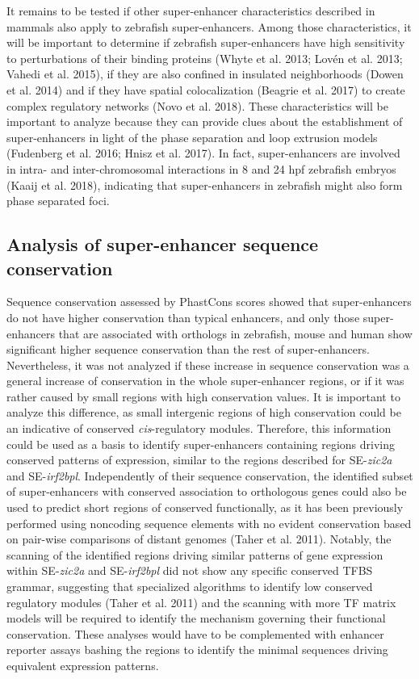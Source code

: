It remains to be tested if other super-enhancer characteristics described in mammals also apply to zebrafish super-enhancers. Among those characteristics, it will be important to determine if zebrafish super-enhancers have high sensitivity to perturbations of their binding proteins (Whyte et al. 2013; Lovén et al. 2013; Vahedi et al. 2015), if they are also confined in insulated neighborhoods (Dowen et al. 2014) and if they have spatial colocalization (Beagrie et al. 2017) to create complex regulatory networks (Novo et al. 2018). These characteristics will be important to analyze because they can provide clues about the establishment of super-enhancers in light of the phase separation and loop extrusion models (Fudenberg et al. 2016; Hnisz et al. 2017). In fact, super-enhancers are involved in intra- and inter-chromosomal interactions in 8 and 24 hpf zebrafish embryos (Kaaij et al. 2018), indicating that super-enhancers in zebrafish might also form phase separated foci.\\

		\subsection{Analysis of super-enhancer sequence conservation}

Sequence conservation assessed by PhastCons scores showed that super-enhancers do not have higher conservation than typical enhancers, and only those super-enhancers that are associated with orthologs in zebrafish, mouse and human show significant higher sequence conservation than the rest of super-enhancers. Nevertheless, it was not analyzed if these increase in sequence conservation was a general increase of conservation in the whole super-enhancer regions, or if it was rather caused by small regions with high conservation values. It is important to analyze this difference, as small intergenic regions of high conservation could be an indicative of conserved \textit{cis}-regulatory modules. Therefore, this information could be used as a basis to identify super-enhancers containing regions driving conserved patterns of expression, similar to the regions described for SE-\textit{zic2a} and SE-\textit{irf2bpl}. Independently of their sequence conservation, the identified subset of super-enhancers with conserved association to orthologous genes could also be used to predict short regions of conserved functionally, as it has been previously performed using noncoding sequence elements with no evident conservation based on pair-wise comparisons of distant genomes (Taher et al. 2011). Notably, the scanning of the identified regions driving similar patterns of gene expression within SE-\textit{zic2a} and SE-\textit{irf2bpl} did not show any specific conserved TFBS grammar, suggesting that specialized algorithms to identify low conserved regulatory modules (Taher et al. 2011) and the scanning with more TF matrix models will be required to identify the mechanism governing their functional conservation. These analyses would have to be complemented with enhancer reporter assays bashing the regions to identify the minimal sequences driving equivalent expression patterns.\\

